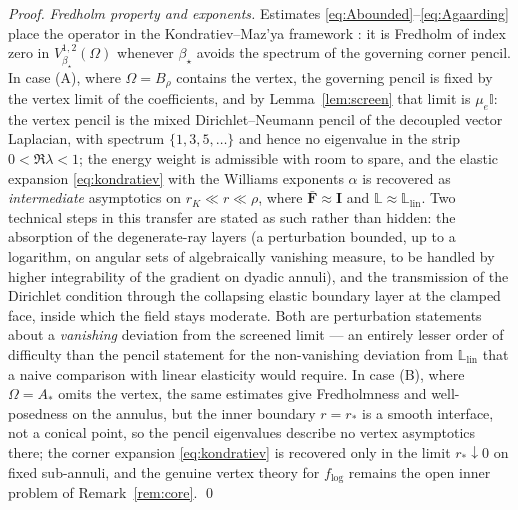 \begin{proof}
    \emph{Fredholm property and exponents.} Estimates \eqref{eq:Abounded}--\eqref{eq:Agaarding} place the operator in the
    Kondratiev--Maz'ya framework \cite{KMR2001}: it is Fredholm of index zero in $V^{1,2}_{\beta_\star}(\Omega)$ whenever
    $\beta_\star$ avoids the spectrum of the governing corner pencil. In case (A), where $\Omega=B_\rho$ contains the
    vertex, the governing pencil is fixed by the vertex limit of the coefficients, and by Lemma~\ref{lem:screen} that
    limit is $\mu_e\mathbb{I}$: the vertex pencil is the mixed Dirichlet--Neumann pencil of the decoupled vector
    Laplacian, with spectrum $\{1,3,5,\dots\}$ and hence no eigenvalue in the strip $0<\Re\lambda<1$; the energy weight
    is admissible with room to spare, and the elastic expansion \eqref{eq:kondratiev} with the Williams exponents
    $\alpha$ is recovered as \emph{intermediate} asymptotics on $r_K\ll r\ll\rho$, where $\bar{\bm F}\approx\bm I$ and
    $\mathbb{L}\approx\mathbb{L}_{\mathrm{lin}}$. Two technical steps in this transfer are stated as such rather than
    hidden: the absorption of the degenerate-ray layers (a perturbation bounded, up to a logarithm, on angular sets of
    algebraically vanishing measure, to be handled by higher integrability of the gradient on dyadic annuli), and the
    transmission of the Dirichlet condition through the collapsing elastic boundary layer at the clamped face, inside
    which the field stays moderate. Both are perturbation statements about a \emph{vanishing} deviation from the
    screened limit --- an entirely lesser order of difficulty than the pencil statement for the non-vanishing deviation
    from $\mathbb{L}_{\mathrm{lin}}$ that a naive comparison with linear elasticity would require. In case (B), where
    $\Omega=A_*$ omits the vertex, the same estimates give Fredholmness and
    well-posedness on the annulus, but the inner boundary $r=r_*$ is a smooth interface, not a conical point, so the
    pencil eigenvalues describe no vertex asymptotics there; the corner expansion \eqref{eq:kondratiev} is recovered only
    in the limit $r_*\downarrow0$ on fixed sub-annuli, and the genuine vertex theory for $f_{\log}$ remains the open
    inner problem of Remark~\ref{rem:core}. \qed
\end{proof}

